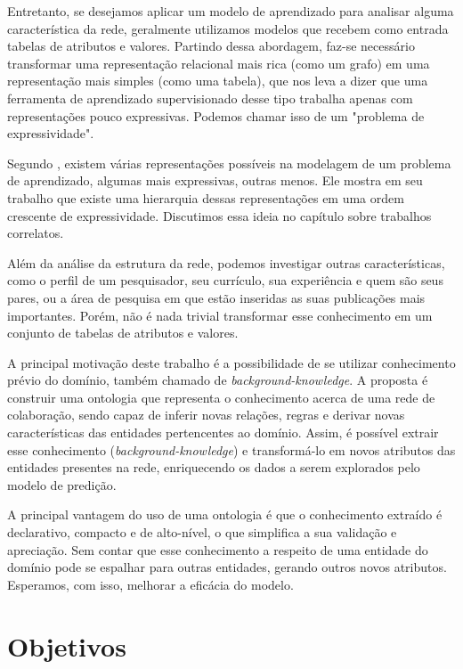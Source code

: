 Entretanto, se desejamos aplicar um modelo de aprendizado para analisar alguma característica da rede, geralmente utilizamos modelos que recebem como entrada tabelas de atributos e valores. Partindo dessa abordagem, faz-se necessário transformar uma representação relacional mais rica (como um grafo) em uma representação mais simples (como uma tabela), que nos leva a dizer que uma ferramenta de aprendizado supervisionado desse tipo trabalha apenas com representações pouco expressivas. Podemos chamar isso de um "problema de expressividade".

Segundo \citet{Raedt2008}, existem várias representações possíveis na modelagem de um problema de aprendizado, algumas mais expressivas, outras menos. Ele mostra em seu trabalho que existe uma hierarquia dessas representações em uma ordem crescente de expressividade. Discutimos essa ideia no capítulo sobre trabalhos correlatos.

Além da análise da estrutura da rede, podemos investigar outras características, como o perfil de um pesquisador, seu currículo, sua experiência e quem são seus pares, ou a área de pesquisa em que estão inseridas as suas publicações mais importantes. Porém, não é nada trivial transformar esse conhecimento em um conjunto de tabelas de atributos e valores.

A principal motivação deste trabalho é a possibilidade de se utilizar conhecimento prévio do domínio, também chamado de \textit{background-knowledge}. A proposta é construir uma ontologia que representa o conhecimento acerca de uma rede de colaboração, sendo capaz de inferir novas relações, regras e derivar novas características das entidades pertencentes ao domínio. Assim, é possível extrair esse conhecimento (\textit{background-knowledge}) e transformá-lo em novos atributos das entidades presentes na rede, enriquecendo os dados a serem explorados pelo modelo de predição.

A principal vantagem do uso de uma ontologia é que o conhecimento extraído é declarativo, compacto e de alto-nível, o que simplifica a sua validação e apreciação. Sem contar que esse conhecimento a respeito de uma entidade do domínio pode se espalhar para outras entidades, gerando outros novos atributos. Esperamos, com isso, melhorar a eficácia do modelo.

\section{Objetivos}
\label{sec:objetivos}

